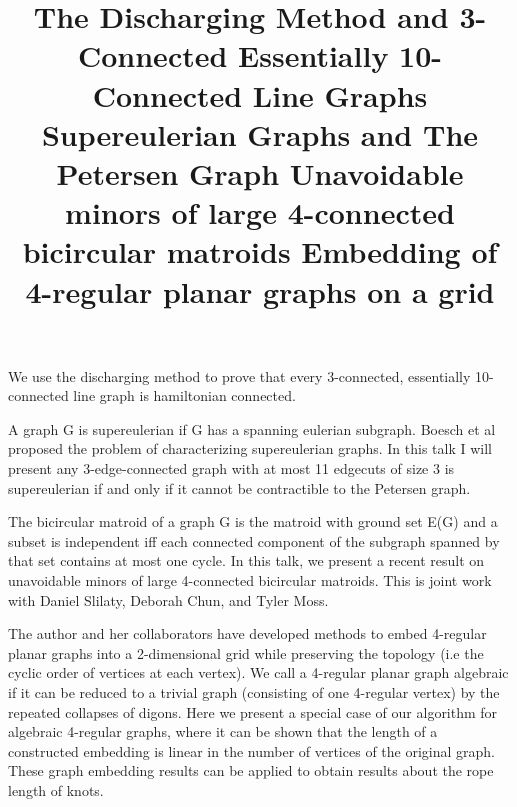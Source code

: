 \documentclass{article}
\begin{document}
\vspace{.25in}

\title{ The Discharging Method and 3-Connected Essentially 10-Connected Line Graphs}
\endtitle
We use the discharging method to prove that every 3-connected,
essentially 10-connected line graph is hamiltonian connected. 



\vspace{.25in}

\title{ Supereulerian Graphs and The Petersen Graph}
\endtitle
A graph G is supereulerian if G has a spanning eulerian subgraph.
Boesch et al proposed the problem of characterizing supereulerian graphs. In
this talk I will present any 3-edge-connected graph with at most 11 edgecuts
of size 3 is supereulerian if and only if it cannot be contractible to the
Petersen graph. 


\vspace{.25in}

\title{ Unavoidable minors of large 4-connected bicircular matroids }
\endtitle
The bicircular matroid of a graph G is the matroid with ground
set E(G) and a subset is independent iff each connected component of the
subgraph spanned by that set contains at most one cycle.   In this talk, we
present a recent result on unavoidable minors of large 4-connected
bicircular matroids. This is joint work with Daniel Slilaty, Deborah Chun,
and Tyler Moss.  


\vspace{.25in}

\title{ Embedding of 4-regular planar graphs on a grid}
\endtitle
The author and her collaborators have developed methods to embed 4-regular planar graphs into a 2-dimensional grid while preserving the topology (i.e the cyclic order of vertices at each vertex). We call a 4-regular planar graph algebraic if it can be reduced to a trivial graph (consisting of one 4-regular vertex) by the repeated collapses of digons. Here we present a special case of our algorithm for algebraic 4-regular graphs, where it can be shown that the length of a constructed embedding is linear in the number of vertices of the original graph. These graph embedding results can be applied to obtain results about the rope length of knots.
\end{document}
